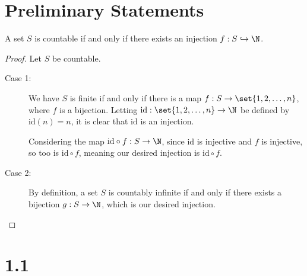 \documentclass[10pt]{mypackage}
\begin{document}
\section{Preliminary Statements}%
\begin{theorem}
  A set $S$ is countable if and only if there exists an injection $f: S\hookrightarrow \N$.
\end{theorem}
\begin{proof}
  Let $S$ be countable.
  \begin{description}
    \item[Case 1:] We have $S$ is finite if and only if there is a map $f: S\rightarrow \set{1,2,\dots,n}$, where $f$ is a bijection. Letting $\text{id}: \set{1,2,\dots,n} \rightarrow \N$ be defined by $\text{id}(n) = n$, it is clear that $\text{id}$ is an injection.\newline

      Considering the map $\text{id}\circ f: S\rightarrow \N$, since $\text{id}$ is injective and $f$ is injective, so too is $\text{id}\circ f$, meaning our desired injection is $\text{id}\circ f$.
    \item[Case 2:] By definition, a set $S$ is countably infinite if and only if there exists a bijection $g: S\rightarrow \N$, which is our desired injection.
  \end{description}
\end{proof}
%
\section{1.1}%
\end{document}
